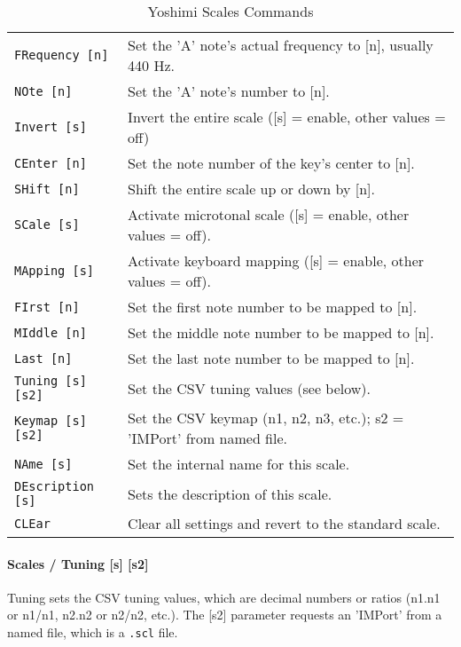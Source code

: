    \begin{table}[H]
      \centering
      \caption{Yoshimi Scales Commands}
      \label{table:yoshimi_text_scales_commands}
      \begin{tabular}{l l}

\texttt{FRequency [n]} &
   Set the 'A' note's actual frequency to [n], usually 440 Hz. \\
\texttt{NOte [n]} &
   Set the 'A' note's number to [n]. \\
\texttt{Invert [s]} &
   Invert the entire scale ([s] = enable, other values = off) \\
\texttt{CEnter [n]} &
   Set the note number of the key's center to [n]. \\
\texttt{SHift [n]} &
   Shift the entire scale up or down by [n]. \\
\texttt{SCale [s]} &
   Activate microtonal scale ([s] = enable, other values = off). \\
\texttt{MApping [s]} &
   Activate keyboard mapping ([s] = enable, other values = off). \\
\texttt{FIrst [n]} &
   Set the first note number to be mapped to [n]. \\
\texttt{MIddle [n]} &
   Set the middle note number to be mapped to [n]. \\
\texttt{Last [n]} &
   Set the last note number to be mapped to [n]. \\
\texttt{Tuning [s] [s2]} &
   Set the CSV tuning values (see below). \\
\texttt{Keymap [s] [s2]} &
   Set the CSV keymap (n1, n2, n3, etc.); s2 = 'IMPort' from named file. \\
\texttt{NAme [s]} &
   Set the internal name for this scale. \\
\texttt{DEscription [s]} &
   Sets the description of this scale. \\
\texttt{CLEar} &
   Clear all settings and revert to the standard scale. \\

      \end{tabular}
   \end{table}

\paragraph{Scales / Tuning [s] [s2]}
\label{paragraph:command_line_tuning}

   Tuning sets the CSV tuning values, which are decimal numbers or ratios
   (n1.n1 or n1/n1, n2.n2 or n2/n2, etc.).
   The [s2] parameter requests an 'IMPort' from a named file, which is
   a \texttt{.scl} file.

